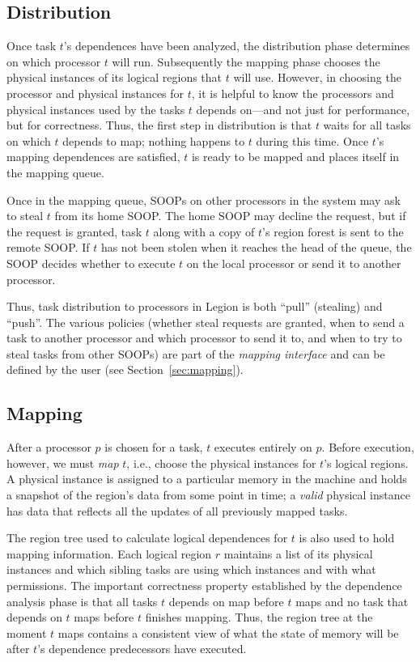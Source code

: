 \subsection{Distribution}
\label{sec:dist}

Once task $t$'s dependences have been analyzed, the distribution phase
determines on which processor $t$ will run.  Subsequently the
mapping phase chooses the physical instances of its logical
regions that $t$ will use.  However, in choosing the processor and
physical instances for $t$, it is helpful to know the processors and
physical instances used by the tasks $t$ depends on---and not just for
performance, but for correctness.  Thus, the first step in
distribution is that $t$ waits for all tasks on which $t$ depends to
map; nothing happens to $t$ during this time.  Once $t$'s mapping
dependences are satisfied, $t$ is ready to be mapped and places
itself in the mapping queue.

Once in the mapping queue, SOOPs on other processors in the system may
ask to steal $t$ from its home SOOP.  The home SOOP may decline the
request, but if the request is granted, task $t$ along with a copy of
$t$'s region forest is sent to the remote SOOP.  If $t$ has not been
stolen when it reaches the head of the queue, the SOOP decides whether
to execute $t$ on the local processor or send it to another processor.

Thus, task distribution to processors in Legion is both ``pull'' (stealing) and ``push''.
The various policies (whether steal requests are granted, when to send
a task to another processor and which processor to send it to, and when to
try to steal tasks from other SOOPs) are part of the {\em mapping interface}
and can be defined by the user (see Section~\ref{sec:mapping}).


\subsection{Mapping}
\label{sec:map}

After a processor $p$ is chosen for a task, $t$ executes entirely on $p$.
Before execution, however, we must {\em map} $t$, i.e., choose the
physical instances for $t$'s logical regions.  A physical instance is assigned
to a particular memory in the machine and holds a snapshot of the region's data
from some point in time; a {\em valid} physical instance has data that reflects
all the updates of all previously mapped tasks.

The region tree used to calculate logical dependences for $t$ is also
used to hold mapping information.  Each logical region $r$ maintains a
list of its physical instances and which sibling tasks are using which
instances and with what permissions.  The important correctness
property established by the dependence analysis phase is that all
tasks $t$ depends on map before $t$ maps and no task that depends on
$t$ maps before $t$ finishes mapping.  Thus, the region tree at the
moment $t$ maps contains a consistent view of what the state of memory
will be after $t$'s dependence predecessors have executed.

